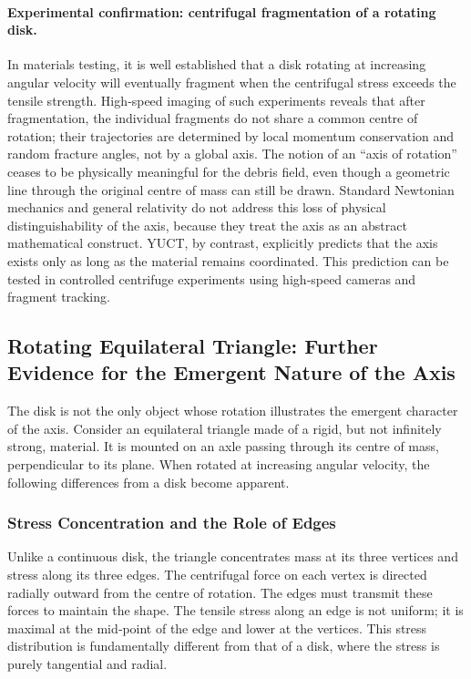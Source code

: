 \documentclass[12pt,a4paper]{article}
\begin{document}
	\paragraph{Experimental confirmation: centrifugal fragmentation of a rotating disk.}
	In materials testing, it is well established that a disk rotating at increasing angular velocity will eventually fragment when the centrifugal stress exceeds the tensile strength. High‑speed imaging of such experiments reveals that after fragmentation, the individual fragments do not share a common centre of rotation; their trajectories are determined by local momentum conservation and random fracture angles, not by a global axis. The notion of an ``axis of rotation'' ceases to be physically meaningful for the debris field, even though a geometric line through the original centre of mass can still be drawn. Standard Newtonian mechanics and general relativity do not address this loss of physical distinguishability of the axis, because they treat the axis as an abstract mathematical construct. YUCT, by contrast, explicitly predicts that the axis exists only as long as the material remains coordinated. This prediction can be tested in controlled centrifuge experiments using high‑speed cameras and fragment tracking.
	
	\subsection{Rotating Equilateral Triangle: Further Evidence for the Emergent Nature of the Axis}
	
	The disk is not the only object whose rotation illustrates the emergent character of the axis. Consider an equilateral triangle made of a rigid, but not infinitely strong, material. It is mounted on an axle passing through its centre of mass, perpendicular to its plane. When rotated at increasing angular velocity, the following differences from a disk become apparent.
	
	\subsubsection{Stress Concentration and the Role of Edges}
	
	Unlike a continuous disk, the triangle concentrates mass at its three vertices and stress along its three edges. The centrifugal force on each vertex is directed radially outward from the centre of rotation. The edges must transmit these forces to maintain the shape. The tensile stress along an edge is not uniform; it is maximal at the mid‑point of the edge and lower at the vertices. This stress distribution is fundamentally different from that of a disk, where the stress is purely tangential and radial.
	
\end{document}
